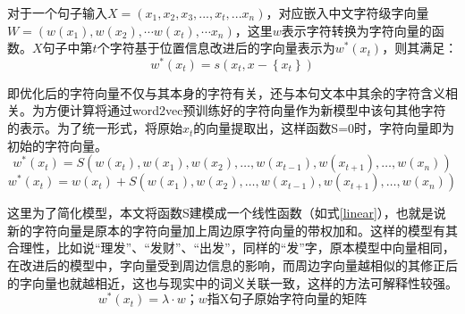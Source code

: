 \documentclass[winfonts,master,oneside,nobackinfo]{njuthesis}
\begin{document}
对于一个句子输入$X=\left(x_{1}, x_{2}, x_{3},...,x_{t},... x_{n}\right)$，对应嵌入中文字符级字向量$W=\left(w\left(x_{1}\right), w\left(x_{2}\right), \cdots w\left(x_{t}\right), \cdots x_{n}\right)$，这里$w$表示字符转换为字符向量的函数。$X$句子中第$t$个字符基于位置信息改进后的字向量表示为$w^{*}(x_{t})$，则其满足：
\begin{equation}
w^{*}\left(x_{t}\right)=s\left(x_{t}, x-\left\{x_{t}\right\}\right)
\end{equation}

即优化后的字符向量不仅与其本身的字符有关，还与本句文本中其余的字符含义相关。为方便计算将通过word2vec预训练好的字符向量作为新模型中该句其他字符的表示。为了统一形式，将原始$x_{t}$的向量提取出，这样函数S=0时，字符向量即为初始的字符向量。
\begin{equation}
w^{*}\left(x_{t}\right)=S\left(w\left(x_{t}\right), w\left(x_{1}\right), w\left(x_{2}\right), \ldots, w\left(x_{t-1}\right), w\left(x_{t+1}\right), \ldots, w\left(x_{n}\right)\right)
\end{equation}
\begin{equation}
w^{*}\left(x_{t}\right)=w\left(x_{t}\right)+S\left( w\left(x_{1}\right), w\left(x_{2}\right), \ldots, w\left(x_{t-1}\right), w\left(x_{t+1}\right), \ldots, w\left(x_{n}\right)\right)
\end{equation}

这里为了简化模型，本文将函数S建模成一个线性函数（如式\ref{linear}），也就是说新的字符向量是原本的字符向量加上周边原字符向量的带权加和。这样的模型有其合理性，比如说“理发”、“发财”、“出发”，同样的“发”字，原本模型中向量相同，在改进后的模型中，字向量受到周边信息的影响，而周边字向量越相似的其修正后的字向量也就越相近，这也与现实中的词义关联一致，这样的方法可解释性较强。
\begin{equation}
w^{*}\left(x_{t}\right)=\lambda \cdot w \mbox{；} w \mbox{指X句子原始字符向量的矩阵}
\label{linear}
\end{equation}
\end{document}
